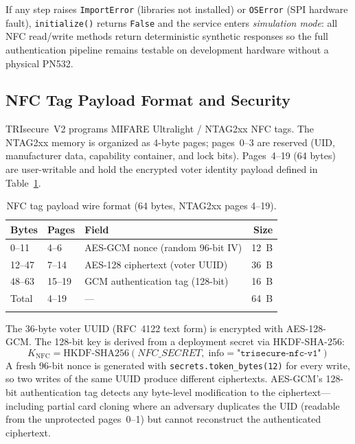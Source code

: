 \documentclass[pdflatex,sn-mathphys-num]{sn-jnl}%
\theoremstyle{thmstyleone}%
\theoremstyle{thmstyletwo}%
\theoremstyle{thmstylethree}%
\begin{document}
If any step raises \texttt{ImportError} (libraries not installed) or
\texttt{OSError} (SPI hardware fault), \texttt{initialize()} returns
\texttt{False} and the service enters \emph{simulation mode}: all NFC
read/write methods return deterministic synthetic responses so the full
authentication pipeline remains testable on development hardware without a
physical PN532.

\subsection{NFC Tag Payload Format and Security}

TRIsecure~V2 programs MIFARE Ultralight / NTAG2xx NFC tags. The NTAG2xx
memory is organized as 4-byte pages; pages~0--3 are reserved (UID,
manufacturer data, capability container, and lock bits). Pages~4--19 (64
bytes) are user-writable and hold the encrypted voter identity payload
defined in Table~\ref{tab:nfc_payload}.

\begin{table}[t]
\caption{NFC tag payload wire format (64 bytes, NTAG2xx pages 4--19).}
\label{tab:nfc_payload}%
\begin{tabular}{@{}lllr@{}}
  \toprule
  Bytes & Pages & Field & Size \\
  \midrule
  0--11   & 4--6    & AES-GCM nonce (random 96-bit IV) & 12~B \\
  12--47  & 7--14   & AES-128 ciphertext (voter UUID) & 36~B \\
  48--63  & 15--19  & GCM authentication tag (128-bit) & 16~B \\
  \midrule
  Total   & 4--19   & --- & 64~B \\
  \botrule
\end{tabular}
\end{table}

The 36-byte voter UUID (RFC~4122 text form) is encrypted with AES-128-GCM.
The 128-bit key is derived from a deployment secret via HKDF-SHA-256:
\begin{equation}
  K_{\mathrm{NFC}} = \mathrm{HKDF\text{-}SHA256}(\mathit{NFC\_SECRET},\;
    \text{info}{=}\texttt{"trisecure-nfc-v1"})
\end{equation}
A fresh 96-bit nonce is generated with \texttt{secrets.token\_bytes(12)} for
every write, so two writes of the same UUID produce different ciphertexts.
AES-GCM's 128-bit authentication tag detects any byte-level modification to
the ciphertext---including partial card cloning where an adversary duplicates
the UID (readable from the unprotected pages~0--1) but cannot reconstruct the
authenticated ciphertext.
\end{document}
